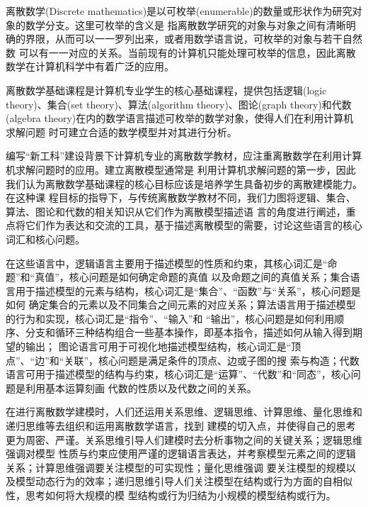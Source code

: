 
\begin{window} 离散数学(Discrete mathematics)是以可枚举(enumerable)的数量或形状作为研究对象的数学分支。这里可枚举的含义是
指离散数学研究的对象与对象之间有清晰明确的界限，从而可以一一罗列出来，或者用数学语言说，可枚举的对象与若干自然数
可以有一一对应的关系。当前现有的计算机只能处理可枚举的信息，因此离散数学在计算机科学中有着广泛的应用。
\end{window}


离散数学基础课程是计算机专业学生的核心基础课程，提供包括逻辑(logic theory)、集合(set theory)、算法(algorithm
theory)、图论(graph theory)和代数(algebra theory)在内的数学语言描述可枚举的数学对象，使得人们在利用计算机求解问题
时可建立合适的数学模型并对其进行分析。

编写“新工科”建设背景下计算机专业的离散数学教材，应注重离散数学在利用计算机求解问题时的应用。建立离散模型通常是
利用计算机求解问题的第一步，因此我们认为离散数学基础课程的核心目标应该是培养学生具备初步的离散建模能力。在这种课
程目标的指导下，与传统离散数学教材不同，我们力图将逻辑、集合、算法、图论和代数的相关知识从它们作为离散模型描述语
言的角度进行阐述，重点将它们作为表达和交流的工具，基于描述离散模型的需要，讨论这些语言的核心词汇和核心问题。

在这些语言中，逻辑语言主要用于描述模型的性质和约束，其核心词汇是“命题”和“真值”，核心问题是如何确定命题的真值
以及命题之间的真值关系；集合语言用于描述模型的元素与结构，核心词汇是“集合”、“函数”与“关系”，核心问题是如何
确定集合的元素以及不同集合之间元素的对应关系；算法语言用于描述模型的行为和实现，核心词汇是“指令”、“输入”和
“输出”，核心问题是如何利用顺序、分支和循环三种结构组合一些基本操作，即基本指令，描述如何从输入得到期望的输出；
图论语言可用于可视化地描述模型结构，核心词汇是“顶点”、“边”和“关联”，核心问题是满足条件的顶点、边或子图的搜
索与构造；代数语言可用于描述模型的结构与约束，核心词汇是“运算”、“代数”和“同态”，核心问题是利用基本运算刻画
代数的性质以及代数之间的关系。

在进行离散数学建模时，人们还运用关系思维、逻辑思维、计算思维、量化思维和递归思维等去组织和运用离散数学语言，找到
建模的切入点，并使得自己的思考更为周密、严谨。关系思维引导人们建模时去分析事物之间的关键关系；逻辑思维强调对模型
性质与约束应使用严谨的逻辑语言表达，并考察模型元素之间的逻辑关系；计算思维强调要关注模型的可实现性；量化思维强调
要关注模型的规模以及模型动态行为的效率；递归思维引导人们关注模型在结构或行为方面的自相似性，思考如何将大规模的模
型结构或行为归结为小规模的模型结构或行为。

